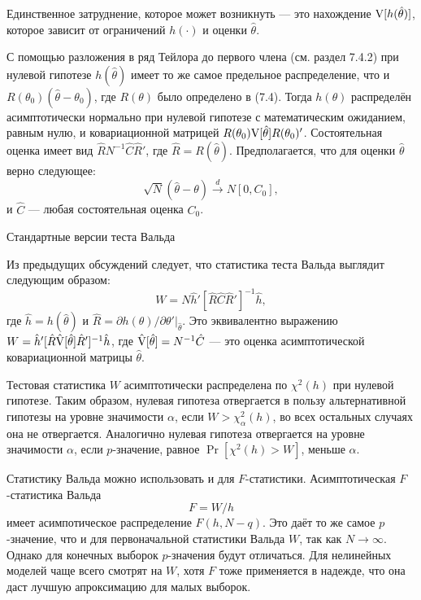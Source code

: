 Единственное затруднение, которое может возникнуть --- это нахождение $\mathrm{V}[h(\hat{\theta})]$, которое зависит от ограничений $h(\cdot)$ и оценки $\hat{\theta}$.

С помощью разложения в ряд Тейлора до первого члена (см. раздел 7.4.2) при нулевой гипотезе $h(\hat{\theta})$ имеет то же самое предельное распределение, что и $R(\theta_0)(\hat{\theta} - \theta_0)$, где $R(\theta)$ было определено в (7.4). Тогда $h(\theta)$ распределён асимптотически нормально при нулевой гипотезе с математическим ожиданием, равным нулю, и ковариационной матрицей $R(\theta_0)\mathrm{V}[\hat{\theta}]R(\theta_0)'$. Состоятельная оценка имеет вид $\hat{R}N^{-1}\hat{C}\hat{R}'$, где $\hat{R} = R(\hat{\theta})$. Предполагается, что для оценки $\hat{\theta}$ верно следующее:
\begin{equation}
\sqrt{N}(\hat{\theta} - \theta) \stackrel{d}{\rightarrow} N[0, C_0],
\end{equation}
и $\hat{C}$ --- любая состоятельная оценка $C_0$.

\begin{center}
Стандартные версии теста Вальда
\end{center}

Из предыдущих обсуждений следует, что статистика теста Вальда выглядит следующим образом:
\begin{equation}
W = N\hat{h}'[\hat{R}\hat{C}\hat{R}']^{-1}\hat{h},
\end{equation}
где $\hat{h} = h(\hat{\theta})$ и $\hat{R} = \partial{h(\theta)}/\partial{\theta'}|_{\hat{\theta}}$. Это эквивалентно выражению $W = \hat{h}'[\hat{R}\hat{\mathrm{V}}[\hat{\theta}]\hat{R}']^{-1}\hat{h}$, где $\hat{\mathrm{V}}[\hat{\theta}] = N^{-1}\hat{C}$ --- это оценка асимптотической ковариационной матрицы $\hat{\theta}$.

Тестовая статистика $W$ асимптотически распределена по $\chi^2(h)$ при нулевой гипотезе. Таким образом, нулевая гипотеза отвергается в пользу альтернативной гипотезы на уровне значимости $\alpha$, если $W > \chi_{\alpha}^2(h)$, во всех остальных случаях она не отвергается. Аналогично нулевая гипотеза отвергается на уровне значимости $\alpha$, если $p$-значение, равное $\Pr[\chi^2(h) > W]$, меньше $\alpha$.

Статистику Вальда можно использовать и для $F$-статистики. Асимптотическая $F$-статистика Вальда
\begin{equation}
F = W/h
\end{equation}
имеет асимпотическое распределение $F(h, N - q)$. Это даёт то же самое $p$-значение, что и для первоначальной статистики Вальда $W$, так как $N \rightarrow \infty$. Однако для конечных выборок $p$-значения будут отличаться. Для нелинейных моделей чаще всего смотрят на $W$, хотя $F$ тоже применяется в надежде, что она даст лучшую апроксимацию для малых выборок.

